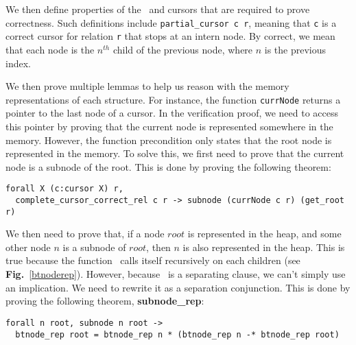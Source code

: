 We then define properties of the \btrees\ and cursors that are required to prove correctness.
Such definitions include \texttt{partial\_cursor c r}, meaning that \texttt{c} is a correct cursor for relation \texttt{r} that stops at an intern node.
By correct, we mean that each node is the $n^{th}$ child of the previous node, where $n$ is the previous index.

We then prove multiple lemmas to help us reason with the memory representations of each structure.
For instance, the function \texttt{currNode} returns a pointer to the last node of a cursor.
In the verification proof, we need to access this pointer by proving that the current node is represented somewhere in the memory.
However, the function precondition only states that the root node is represented in the memory.
To solve this, we first need to prove that the current node is a subnode of the root.
This is done by proving the following theorem:
\begin{lstlisting}[language=Coq]
  forall X (c:cursor X) r,
  complete_cursor_correct_rel c r -> subnode (currNode c r) (get_root r)
\end{lstlisting}

We then need to prove that, if a node $root$ is represented in the heap, and some other node $n$ is a subnode of $root$, then $n$ is also represented in the heap.
This is true because the function \btrep\ calls itself recursively on each children (see \textbf{Fig.}~\ref{btnoderep}).
However, because \btrep\ is a separating clause, we can't simply use an implication. We need to rewrite it as a separation conjunction.
This is done by proving the following theorem, \textbf{subnode\_rep}:

\begin{lstlisting}[language=Coq]
  forall n root, subnode n root ->
  btnode_rep root = btnode_rep n * (btnode_rep n -* btnode_rep root)
\end{lstlisting}


